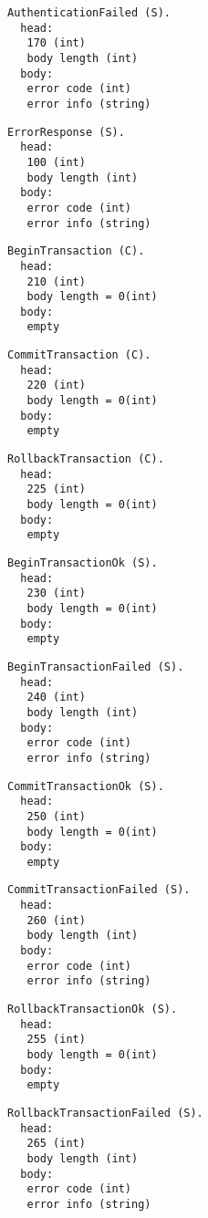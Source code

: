 \documentclass[a4paper,12pt]{article}
\begin{document}
\begin{verbatim}
AuthenticationFailed (S).
  head:
   170 (int)
   body length (int)
  body:
   error code (int)
   error info (string)
\end{verbatim}

\begin{verbatim}
ErrorResponse (S).
  head:
   100 (int)
   body length (int)
  body:
   error code (int)
   error info (string)
\end{verbatim}   

\begin{verbatim}
BeginTransaction (C).
  head:
   210 (int)
   body length = 0(int)
  body:
   empty
\end{verbatim}   

\begin{verbatim}
CommitTransaction (C).
  head:
   220 (int)
   body length = 0(int)
  body:
   empty
\end{verbatim}   

\begin{verbatim}
RollbackTransaction (C).
  head:
   225 (int)
   body length = 0(int)
  body:
   empty
\end{verbatim}   

\begin{verbatim}
BeginTransactionOk (S).
  head:
   230 (int)
   body length = 0(int)
  body:
   empty
\end{verbatim}
   
\begin{verbatim}
BeginTransactionFailed (S).
  head:
   240 (int)
   body length (int)
  body:
   error code (int)
   error info (string)
\end{verbatim}

\begin{verbatim}
CommitTransactionOk (S).
  head:
   250 (int)
   body length = 0(int)
  body:
   empty
\end{verbatim}

\begin{verbatim}
CommitTransactionFailed (S).
  head:
   260 (int)
   body length (int)
  body:
   error code (int)
   error info (string)
\end{verbatim}

\begin{verbatim}
RollbackTransactionOk (S).
  head:
   255 (int)
   body length = 0(int)
  body:
   empty
\end{verbatim}

\begin{verbatim}
RollbackTransactionFailed (S).
  head:
   265 (int)
   body length (int)
  body:
   error code (int)
   error info (string)
\end{verbatim}
\end{document}
